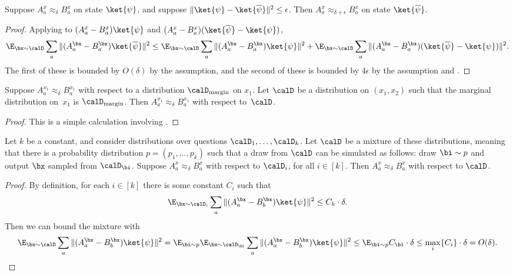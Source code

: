 \documentclass[11pt]{article}
\begin{document}
\begin{fact}\label{fact:the-ol-state-y-swaperoonie}
Suppose $A_a^x \approx_{\delta} B_a^x$ on state $\ket{\psi}$, and suppose $\Vert \ket{\psi} - \ket{\overline{\psi}} \Vert^2 \leq \epsilon$.
Then $A_a^x \approx_{\delta+\epsilon} B_a^x$ on state $\ket{\overline{\psi}}$.
\end{fact}
\begin{proof}
Applying  to $(A_{a}^{x} - B_{a}^{x} ) \ket{\psi}$ and $(A_{a}^{x} - B_{a}^{x} ) (\ket{\overline{\psi}} - \ket{\psi})$,
\begin{equation*}
\E_{\bx \sim \calD} \sum_a \Vert (A_{a}^{\bx} - B_{a}^{\bx} ) \ket{\overline{\psi}}\Vert^2
\leq \E_{\bx \sim \calD} \sum_a \Vert (A_{a}^{\bx} - B_{a}^{\bx} ) \ket{\psi}\Vert^2 + \E_{\bx \sim \calD} \sum_a \Vert (A_{a}^{\bx} - B_{a}^{\bx} ) (\ket{\overline{\psi}}-\ket{\psi})\Vert^2.
\end{equation*}
The first of these is bounded by $O(\delta)$ by the assumption, and the second of these is bounded by $4\epsilon$ by the assumption and .
\end{proof}

\begin{fact}\label{fact:close-on-marginal}
Suppose $A_a^{x_1} \approx_{\delta} B_a^{x_1}$ with respect to a distribution $\calD_{\mathrm{margin}}$ on $x_1$.
Let $\calD$ be a distribution on $(x_1, x_2)$ such that the marginal distribution on~$x_1$ is $\calD_{\mathrm{margin}}$.
Then $A_a^{x_1} \approx_{\delta} B_a^{x_1}$ with respect to~$\calD$.
\end{fact}
\begin{proof}
This is a simple calculation involving .
\end{proof}

\begin{fact}\label{fact:average-over-dists}
Let $k$ be a constant, and consider distributions over questions $\calD_1, \ldots, \calD_k$.
Let $\calD$ be a mixture of these distributions,
meaning that there is a probability distribution $p = (p_1, \ldots, p_k)$
such that a draw from $\calD$ can be simulated as follows: draw $\bi \sim p$ and output $\bx$ sampled from $\calD_{\bi}$.
Suppose $A^x_a \approx_{\delta} B^{x}_a$ with respect to $\calD_i$, for all $i \in [k]$.
Then $A^x_a \approx_{\delta} B^{x}_a$ with respect to $\calD$.
\end{fact}
\begin{proof}
By definition, for each $i \in [k]$ there is some constant $C_i$ such that 
\begin{equation*}
\E_{\bx \sim \calD_i} \sum_{a} \Vert (A^{\bx}_a - B^{\bx}_b) \ket{\psi} \Vert^2 \leq C_k \cdot \delta.
\end{equation*}
Then we can bound the mixture with
\begin{equation*}
\E_{\bx \sim \calD} \sum_{a} \Vert (A^{\bx}_a - B^{\bx}_b) \ket{\psi} \Vert^2
= \E_{\bi \sim p} \E_{\bx \sim \calD_{\bi}} \sum_{a} \Vert (A^{\bx}_a - B^{\bx}_b) \ket{\psi} \Vert^2
\leq \E_{\bi \sim p} C_{\bi} \cdot \delta \leq \max_{i}\{C_i\} \cdot \delta = O(\delta).\qedhere
\end{equation*}
\end{proof}
\end{document}
